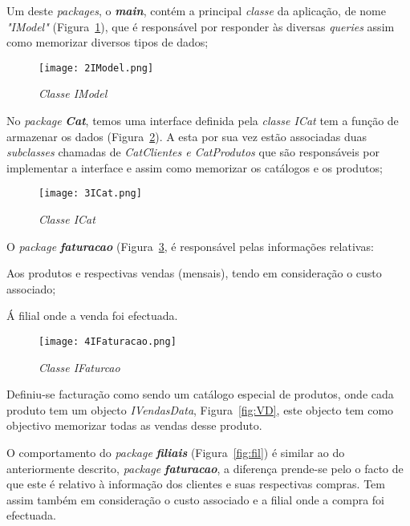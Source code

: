 \documentclass{article}
\newcommand{\SubItem}[1]{
    {\setlength\itemindent{15pt} \item[-] #1}
}
\begin{document}
\begin{itemize}

\item Um deste \textit{packages}, o \textbf{\textit{main}}, contém a principal \textit{classe} da aplicação, de nome \textit{"IModel"} (Figura~\ref{fig:mod}), que é responsável por responder às diversas \textit{queries}  assim como memorizar diversos tipos de dados;

\begin{figure}[H]
\texttt{[image: 2IModel.png]}
\centering
\caption{\textit{Classe IModel}\label{fig:mod}}
\end{figure}

\item No \textit{package} \textbf{\textit{Cat}}, temos uma interface definida pela \textit{classe ICat} tem a função de armazenar os dados (Figura~\ref{fig:cat}). A esta por sua vez estão associadas duas \textit{subclasses} chamadas de  \textit{CatClientes e CatProdutos} que são responsáveis por implementar a interface e assim como memorizar os catálogos e os produtos;

\begin{figure}[H]
\texttt{[image: 3ICat.png]}
\centering
\caption{\textit{Classe ICat}\label{fig:cat}}
\end{figure}

\item O \textit{package} \textbf{\textit{faturacao}} (Figura~\ref{fig:fat}, é responsável pelas informações relativas:

\SubItem{Aos produtos e respectivas vendas (mensais), tendo em consideração o custo associado;}
\SubItem{Á filial onde a venda foi efectuada.}

\begin{figure}[H]
\texttt{[image: 4IFaturacao.png]}
\centering
\caption{\textit{Classe IFaturcao}\label{fig:fat}}
\end{figure}

Definiu-se facturação como sendo um catálogo especial de produtos, onde cada produto tem um objecto \textit{IVendasData}, Figura~\ref{fig:VD}, este objecto tem como objectivo memorizar todas as vendas desse produto.


\item O comportamento do \textit{package} \textbf{\textit{filiais}} (Figura~\ref{fig:fil}) é similar ao do anteriormente descrito, \textit{package} \textbf{\textit{faturacao}}, a diferença prende-se pelo o facto de que este é relativo à informação dos clientes e suas respectivas compras. Tem assim também em consideração o custo associado e a filial onde a compra foi efectuada.


\end{itemize}
\end{document}
